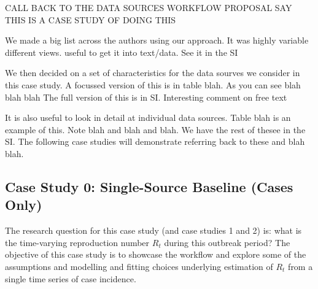 \documentclass{article}
\begin{document}
CALL BACK TO THE DATA SOURCES WORKFLOW PROPOSAL
SAY THIS IS A CASE STUDY OF DOING THIS

We made a big list across the authors using our approach. It was highly variable different views. useful to get it into text/data. See it in the SI

We then decided on a set of characteristics for the data sourves we consider in this case study. A focussed version of this is in table blah. As you can see blah blah blah
The full version of this is in SI. Interesting comment on free text

It is also useful to look in detail at individual data sources. Table blah is an example of this. Note blah and blah and blah.
We have the rest of thesee in the SI. 
The following case studies will demonstrate referring back to these and blah blah.



\subsection{Case Study 0: Single-Source Baseline (Cases Only)}


The research question for this case study (and case studies 1 and 2) is: what is the time-varying reproduction number $R_t$ during this outbreak period?
The objective of this case study is to showcase the workflow and explore some of the assumptions and modelling and fitting choices underlying estimation of $R_t$ from a single time series of case incidence.



\end{document}
